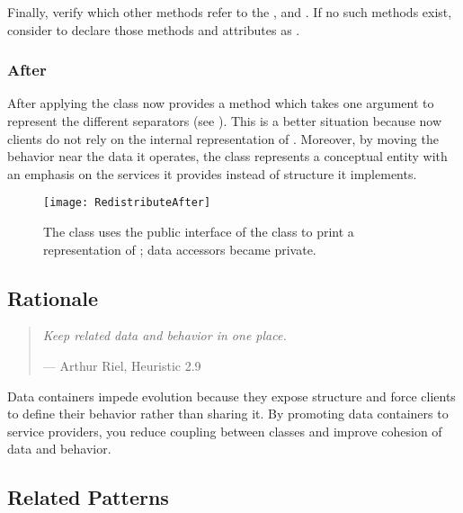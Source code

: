 \documentclass[a4paper,10pt,twoside]{book}
\begin{document}
Finally, verify which other methods refer to the ,  and . If no such methods exist, consider to declare those methods and attributes as .

\subsubsection*{After}

After applying  the class  now provides a  method which takes one argument to represent the different separators (see ). This is a better situation because now clients do not rely on the internal representation of . Moreover, by moving the behavior near the data it operates, the class represents a conceptual entity with an emphasis on the services it provides instead of structure it implements.

\begin{figure}
\begin{center}
\texttt{[image: RedistributeAfter]}
\caption{The  class uses the public interface of the class  to print a representation of ; data accessors became private.}
\end{center}
\end{figure}


\subsection*{Rationale}

\begin{quotation}
\emph{Keep related data and behavior in one place.}

\hfill  --- Arthur Riel, Heuristic 2.9 \cite{Riel96a}
\end{quotation}

Data containers impede evolution because they expose structure and force clients to define their behavior rather than sharing it. By promoting data containers to service providers, you reduce coupling between classes and improve cohesion of data and behavior.

\subsection*{Related Patterns}
\end{document}

